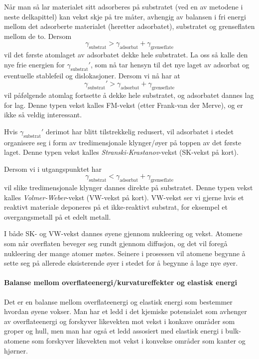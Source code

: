 Når man så lar materialet sitt adsorberes på substratet (ved en av metodene i neste delkapittel) kan vekst skje på tre måter, avhengig av balansen i fri energi mellom det adsorberte materialet (heretter adsorbatet), substratet og grenseflaten mellom de to. Dersom
\begin{equation}
	\gamma_{\text{substrat}} > \gamma_{\text{adsorbat}} + \gamma_{\text{grenseflate}}
\end{equation}
vil det første atomlaget av adsorbatet dekke hele substratet. La oss så kalle den nye frie energien for $\gamma_{\text{substrat}}'$, som nå tar hensyn til det nye laget av adsorbat og eventuelle stablefeil og dislokasjoner. Dersom vi nå har at 
\begin{equation}
	\gamma_{\text{substrat}}' > \gamma_{\text{adsorbat}} + \gamma_{\text{grenseflate}}
\end{equation}
vil påfølgende atomlag fortsette å dekke hele substratet, og adsorbatet dannes lag for lag. Denne typen vekst kalles FM-vekst (etter Frank-van der Merve), og er ikke så veldig interessant. 

Hvis $\gamma_{\text{substrat}}'$ derimot har blitt tilstrekkelig redusert, vil adsorbatet i stedet organisere seg i form av tredimensjonale klynger/øyer på toppen av det første laget. Denne typen vekst kalles \emph{Stranski-Krastanov}-vekst (SK-vekst på kort).

Dersom vi i utgangspunktet har 
\begin{equation}
	\gamma_{\text{substrat}} < \gamma_{\text{adsorbat}} + \gamma_{\text{grenseflate}}
\end{equation}
vil slike tredimensjonale klynger dannes direkte på substratet. Denne typen vekst kalles \emph{Volmer-Weber}-vekst (VW-vekst på kort). VW-vekst ser vi gjerne hvis et reaktivt materiale deponeres på et ikke-reaktivt substrat, for eksempel et overgangsmetall på et edelt metall.

I både SK- og VW-vekst dannes øyene gjennom nukleering og vekst. Atomene som når overflaten beveger seg rundt gjennom diffusjon, og det vil foregå nukleering der mange atomer møtes. Seinere i prosessen vil atomene begynne å sette seg på allerede eksisterende øyer i stedet for å begynne å lage nye øyer.


\paragraph{Balanse mellom overflateenergi/kurvatureffekter og elastisk energi} Det er en balanse mellom overflateenergi og elastisk energi som bestemmer hvordan øyene vokser. Man har et ledd i det kjemiske potensialet som avhenger av overflateenergi og forskyver likevekten mot vekst i konkave områder som groper og hull, men man har også et ledd assosiert med elastisk energi i bulk-atomene som forskyver likevekten mot vekst i konvekse områder som kanter og hjørner. %

